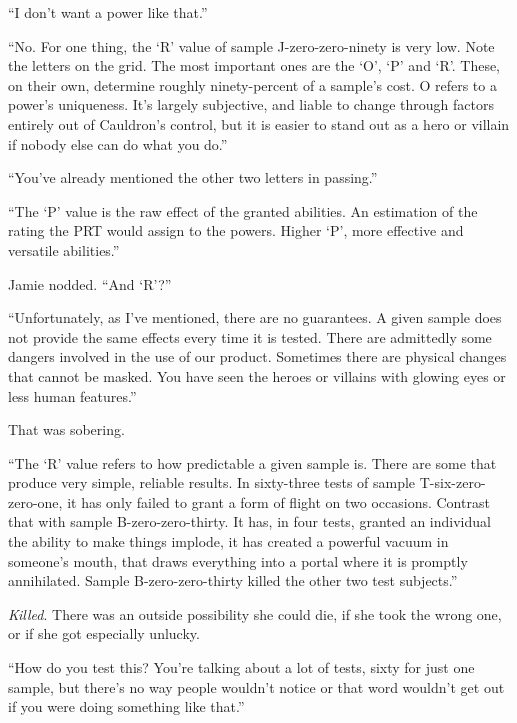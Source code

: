 ``I don't want a power like that.''



``No.  For one thing, the `R' value of sample J-zero-zero-ninety is very low.  Note the letters on the grid.  The most important ones are the `O', `P' and `R'.  These, on their own, determine roughly ninety-percent of a sample's cost.  O refers to a power's uniqueness.  It's largely subjective, and liable to change through factors entirely out of Cauldron's control, but it is easier to stand out as a hero or villain if nobody else can do what you do.''



``You've already mentioned the other two letters in passing.''



``The `P' value is the raw effect of the granted abilities.  An estimation of the rating the PRT would assign to the powers.  Higher `P', more effective and versatile abilities.''



Jamie nodded.  ``And `R'?''



``Unfortunately, as I've mentioned, there are no guarantees.  A given sample does not provide the same effects every time it is tested.  There are admittedly some dangers involved in the use of our product.  Sometimes there are physical changes that cannot be masked.  You have seen the heroes or villains with glowing eyes or less human features.''



That was sobering.



``The `R' value refers to how predictable a given sample is.  There are some that produce very simple, reliable results.  In sixty-three tests of sample T-six-zero-zero-one, it has only failed to grant a form of flight on two occasions.  Contrast that with sample B-zero-zero-thirty.  It has, in four tests, granted an individual the ability to make things implode, it has created a powerful vacuum in someone's mouth, that draws everything into a portal where it is promptly annihilated.  Sample B-zero-zero-thirty killed the other two test subjects.''



\emph{Killed}.  There was an outside possibility she could die, if she took the wrong one, or if she got especially unlucky.



``How do you test this?  You're talking about a lot of tests, sixty for just one sample, but there's no way people wouldn't notice or that word wouldn't get out if you were doing something like that.''



